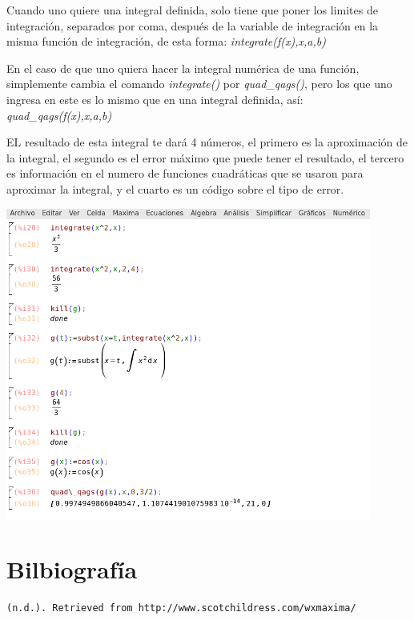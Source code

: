 \documentclass{article}
\begin{document}
Cuando uno quiere una integral definida, solo tiene que poner los limites de integración, separados por coma, después de la variable de integración en la misma función de integración, de esta forma: \textit{integrate(f(x),x,a,b)}

\vspace{0.3cm}

En el caso de que uno quiera hacer la integral numérica de una función, simplemente cambia el comando \textit{integrate()} por \textit{quad\_qags()}, pero los que uno ingresa en este es lo mismo que en una integral definida, así: \textit{quad\_qags(f(x),x,a,b)}

EL resultado de esta integral te dará 4 números, el primero es la aproximación de la integral, el segundo es el error máximo que puede tener el resultado, el tercero es información en el numero de funciones cuadráticas que se usaron para aproximar la integral, y el cuarto es un código sobre el tipo de error.

\begin{center}
	\includegraphics[width=12cm]{int.png}
    
\end{center}
\vspace{0.3cm}



\section{Bilbiografía}

\begin{verbatim}
(n.d.). Retrieved from http://www.scotchildress.com/wxmaxima/ 
\end{verbatim}
\end{document}
